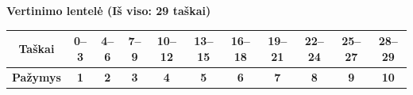 \documentclass[12pt]{exam}
\begin{document}
\vfill 

\begin{center}
    \textbf{Vertinimo lentelė (Iš viso: 29 taškai)} \\[0.2cm]
    \renewcommand{\arraystretch}{1.3} %
    \begin{tabular}{|c|c|c|c|c|c|c|c|c|c|c|}
        \hline
        \textbf{Taškai} & 0--3 & 4--6 & 7--9 & 10--12 & 13--15 & 16--18 & 19--21 & 22--24 & 25--27 & 28--29 \\ \hline
        \textbf{Pažymys} & \textbf{1} & \textbf{2} & \textbf{3} & \textbf{4} & \textbf{5} & \textbf{6} & \textbf{7} & \textbf{8} & \textbf{9} & \textbf{10} \\ \hline
    \end{tabular}
\end{center}
\end{document}
